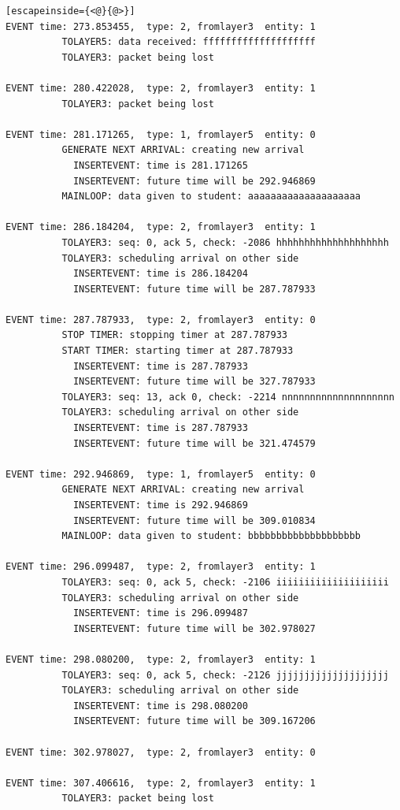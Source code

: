 \documentclass[paper=a4, fontsize=11pt]{scrartcl}
\numberwithin{equation}{section}		%
\numberwithin{figure}{section}			%
\numberwithin{table}{section}				%
\begin{document}
\begin{lstlisting}[escapeinside={<@}{@>}]
EVENT time: 273.853455,  type: 2, fromlayer3  entity: 1
          TOLAYER5: data received: ffffffffffffffffffff
          TOLAYER3: packet being lost

EVENT time: 280.422028,  type: 2, fromlayer3  entity: 1
          TOLAYER3: packet being lost

EVENT time: 281.171265,  type: 1, fromlayer5  entity: 0
          GENERATE NEXT ARRIVAL: creating new arrival
            INSERTEVENT: time is 281.171265
            INSERTEVENT: future time will be 292.946869
          MAINLOOP: data given to student: aaaaaaaaaaaaaaaaaaaa

EVENT time: 286.184204,  type: 2, fromlayer3  entity: 1
          TOLAYER3: seq: 0, ack 5, check: -2086 hhhhhhhhhhhhhhhhhhhh
          TOLAYER3: scheduling arrival on other side
            INSERTEVENT: time is 286.184204
            INSERTEVENT: future time will be 287.787933

EVENT time: 287.787933,  type: 2, fromlayer3  entity: 0
          STOP TIMER: stopping timer at 287.787933
          START TIMER: starting timer at 287.787933
            INSERTEVENT: time is 287.787933
            INSERTEVENT: future time will be 327.787933
          TOLAYER3: seq: 13, ack 0, check: -2214 nnnnnnnnnnnnnnnnnnnn
          TOLAYER3: scheduling arrival on other side
            INSERTEVENT: time is 287.787933
            INSERTEVENT: future time will be 321.474579

EVENT time: 292.946869,  type: 1, fromlayer5  entity: 0
          GENERATE NEXT ARRIVAL: creating new arrival
            INSERTEVENT: time is 292.946869
            INSERTEVENT: future time will be 309.010834
          MAINLOOP: data given to student: bbbbbbbbbbbbbbbbbbbb

EVENT time: 296.099487,  type: 2, fromlayer3  entity: 1
          TOLAYER3: seq: 0, ack 5, check: -2106 iiiiiiiiiiiiiiiiiiii
          TOLAYER3: scheduling arrival on other side
            INSERTEVENT: time is 296.099487
            INSERTEVENT: future time will be 302.978027

EVENT time: 298.080200,  type: 2, fromlayer3  entity: 1
          TOLAYER3: seq: 0, ack 5, check: -2126 jjjjjjjjjjjjjjjjjjjj
          TOLAYER3: scheduling arrival on other side
            INSERTEVENT: time is 298.080200
            INSERTEVENT: future time will be 309.167206

EVENT time: 302.978027,  type: 2, fromlayer3  entity: 0

EVENT time: 307.406616,  type: 2, fromlayer3  entity: 1
          TOLAYER3: packet being lost


\end{lstlisting}
\end{document}
